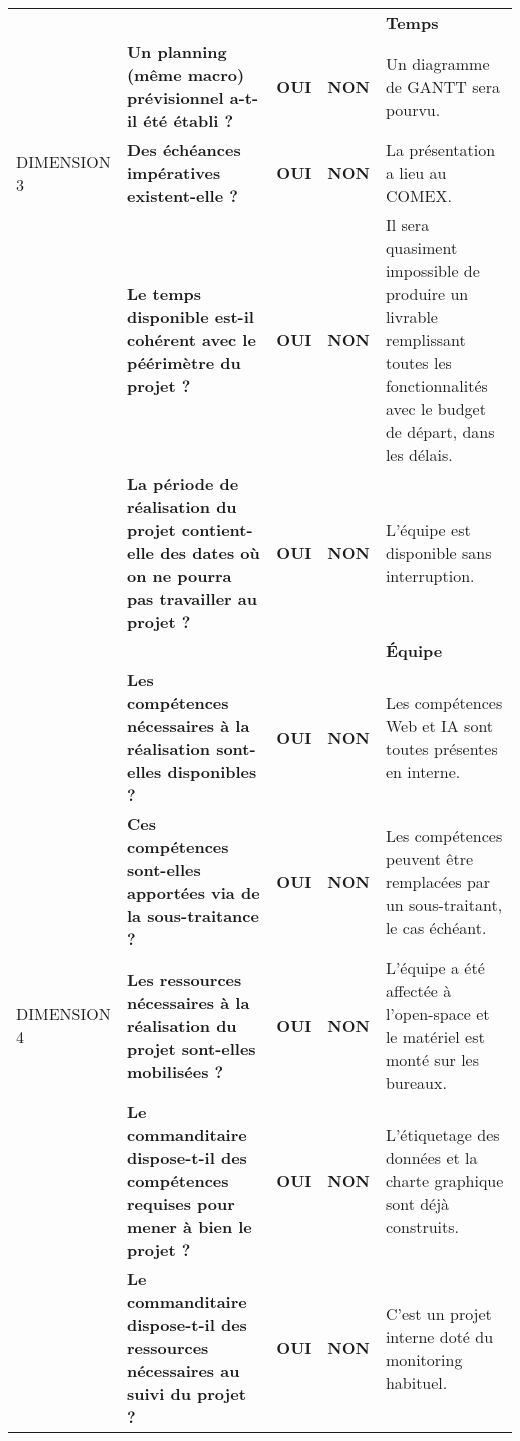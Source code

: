 \documentclass[12pt]{article}
\begin{document}
\begin{landscape}
\begin{table}[H]
{\begin{tabular}{p{2cm}p{}p{1cm}p{1cm}p{12.25cm}}
\hline \cellcolor{orange!75}& \cellcolor{orange!75}& \cellcolor{orange!75}& \cellcolor{orange!75}&\bf Temps \cellcolor{orange!75}\\
\cellcolor{orange!75} & \bf Un planning (même macro) prévisionnel a-t-il été établi ? & \bf OUI \cellcolor{green!50}& \bf NON\cellcolor{red!50} & Un diagramme de GANTT sera pourvu. \\
DIMENSION 3\cellcolor{orange!75} & \bf Des échéances impératives existent-elle ? & \bf OUI \cellcolor{green!50}& \bf NON\cellcolor{red!50} & La présentation a lieu au COMEX. \\
\cellcolor{orange!75} & \bf Le temps disponible est-il cohérent avec le péérimètre du projet ? & \bf OUI \cellcolor{red!50}& \bf NON\cellcolor{green!50} & Il sera quasiment impossible de produire un livrable remplissant toutes les fonctionnalités avec le budget de départ, dans les délais. \\
\cellcolor{orange!75} & \bf La période de réalisation du projet contient-elle des dates où on ne pourra pas travailler au projet ? & \bf OUI \cellcolor{red!50}& \bf NON\cellcolor{green!50} & L’équipe est disponible sans interruption. \\
\hline \cellcolor{yellow!50}& \cellcolor{yellow!50}& \cellcolor{yellow!50}& \cellcolor{yellow!50}&\bf Équipe \cellcolor{yellow!50}\\
\cellcolor{yellow!50} & \bf Les compétences nécessaires à la réalisation sont-elles disponibles ? & \bf OUI \cellcolor{green!50}& \bf NON\cellcolor{red!50} & Les compétences Web et IA sont toutes présentes en interne. \\
\cellcolor{yellow!50} & \bf Ces compétences sont-elles apportées via de la sous-traitance ? & \bf OUI \cellcolor{red!50}& \bf NON\cellcolor{green!50} & Les compétences peuvent être remplacées par un sous-traitant, le cas échéant. \\
DIMENSION 4\cellcolor{yellow!50} & \bf Les ressources nécessaires à la réalisation du projet sont-elles mobilisées ? & \bf OUI \cellcolor{green!50}& \bf NON\cellcolor{red!50} & L’équipe a été affectée à l’open-space et le matériel est monté sur les bureaux. \\
\cellcolor{yellow!50} & \bf Le commanditaire dispose-t-il des compétences requises pour mener à bien le projet ? & \bf OUI \cellcolor{green!50}& \bf NON\cellcolor{red!50} & L’étiquetage des données et la charte graphique sont déjà construits. \\
\cellcolor{yellow!50} & \bf Le commanditaire dispose-t-il des ressources nécessaires au suivi du projet ? & \bf OUI \cellcolor{green!50}& \bf NON\cellcolor{red!50} & C’est un projet interne doté du monitoring habituel. \\

\end{tabular}}
\end{table}
\end{landscape}
\end{document}

